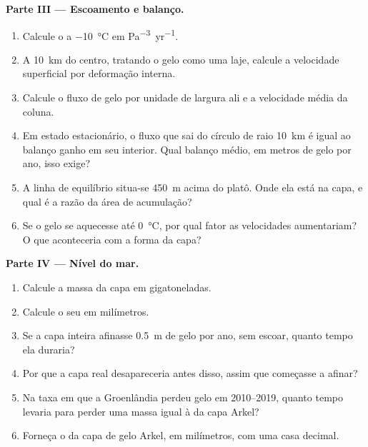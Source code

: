 \begin{problem}
\medskip\noindent\textbf{Parte III --- Escoamento e balanço.}
\begin{enumerate}[resume]
\item Calcule o  a \qty{-10}{\celsius} em
  \unit{Pa^{-3}.yr^{-1}}.
\item A \qty{10}{km} do centro, tratando o gelo como uma laje, calcule
  a velocidade superficial por deformação interna.
\item Calcule o fluxo de gelo por unidade de largura ali e a velocidade média da
  coluna.
\item Em estado estacionário, o fluxo que sai do círculo de raio
  \qty{10}{km} é igual ao balanço ganho em seu interior. Qual balanço médio, em
  metros de gelo por ano, isso exige?
\item A linha de equilíbrio situa-se \qty{450}{m} acima do platô. Onde ela está
  na capa, e qual é a razão da área de acumulação?
\item Se o gelo se aquecesse até \qty{0}{\celsius}, por qual fator as
  velocidades aumentariam? O que aconteceria com a forma da capa?
\end{enumerate}

\medskip\noindent\textbf{Parte IV --- Nível do mar.}
\begin{enumerate}[resume]
\item Calcule a massa da capa em gigatoneladas.
\item Calcule o seu  em milímetros.
\item Se a capa inteira afinasse \qty{0.5}{m} de gelo por ano, sem
  escoar, quanto tempo ela duraria?
\item Por que a capa real desapareceria antes disso, assim que começasse a
  afinar?
\item Na taxa em que a Groenlândia perdeu gelo em 2010--2019, quanto tempo levaria
  para perder uma massa igual à da capa Arkel?
\item Forneça o  da capa de gelo Arkel, em milímetros,
  com uma casa decimal.
\end{enumerate}
\end{problem}

